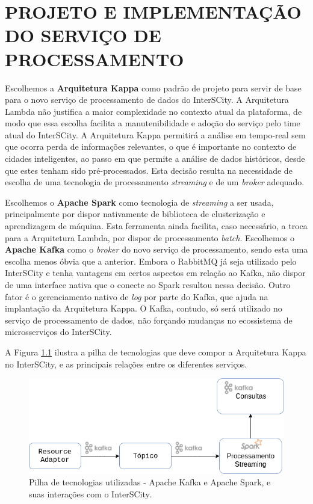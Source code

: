 \chapter[PROJETO E IMPLEMENTAÇÃO DO SERVIÇO DE PROCESSAMENTO]{PROJETO E IMPLEMENTAÇÃO DO SERVIÇO DE PROCESSAMENTO}

\label{chapter:architecture}

Escolhemos a \textbf{Arquitetura Kappa} como padrão de projeto para servir
de base para o novo serviço de processamento de dados do InterSCity.
A Arquitetura Lambda não justifica a maior complexidade no contexto atual da
plataforma, de modo que essa escolha facilita a manutenibilidade e adoção do
serviço pelo time atual do InterSCity. A Arquitetura Kappa permitirá a análise
em tempo-real sem que ocorra perda de informações relevantes, o que é
importante no contexto de cidades inteligentes, ao passo em que permite a
análise de dados históricos, desde que estes tenham sido pré-processados.
Esta decisão resulta na necessidade de escolha de uma tecnologia de
processamento \textit{streaming} e de um \textit{broker} adequado.

Escolhemos o \textbf{Apache Spark} como tecnologia de \textit{streaming}
a ser usada, principalmente por dispor nativamente de biblioteca de clusterização
e aprendizagem de máquina. Esta ferramenta ainda facilita, caso necessário, a
troca para a Arquitetura Lambda, por dispor de processamento \textit{batch}.
Escolhemos o \textbf{Apache Kafka} como o \textit{broker} do novo serviço de
processamento, sendo esta uma escolha menos óbvia que a anterior. Embora o
RabbitMQ já seja utilizado pelo InterSCity e tenha vantagens em certos aspectos
em relação ao Kafka, não dispor de uma interface nativa que o conecte ao Spark
resultou nessa decisão. Outro fator é o gerenciamento nativo de \textit{log}
por parte do Kafka, que ajuda na implantação da Arquitetura Kappa. O Kafka,
contudo, só será utilizado no serviço de processamento de dados, não forçando
mudanças no ecossistema de microsserviços do InterSCity.

A Figura \ref{fig:stack} ilustra a pilha de tecnologias que deve compor a
Arquitetura Kappa no InterSCity, e as principais relações entre os diferentes
serviços.

\begin{figure}
  \centering
    \includegraphics[scale=0.5]{figuras/kappa_tools2.png}
  \caption{Pilha de tecnologias utilizadas - Apache Kafka e Apache Spark, e suas
    interações com o InterSCity.}
  \label{fig:stack}
\end{figure}

